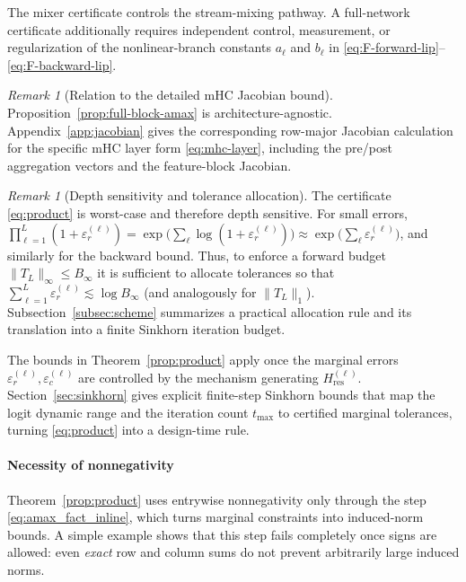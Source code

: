 \documentclass[11pt]{article}
\numberwithin{equation}{section}
\theoremstyle{plain}
\theoremstyle{definition}
\theoremstyle{remark}
\newtheorem{remark}[theorem]{Remark}
\newcommand{\Hres}{H_{\mathrm{res}}}
\begin{document}
The mixer certificate controls the stream-mixing pathway. A full-network certificate additionally requires independent control, measurement, or regularization of the nonlinear-branch constants $a_\ell$ and $b_\ell$ in \eqref{eq:F-forward-lip}--\eqref{eq:F-backward-lip}.

\begin{remark}[Relation to the detailed mHC Jacobian bound]
Proposition~\ref{prop:full-block-amax} is architecture-agnostic. Appendix~\ref{app:jacobian} gives the corresponding row-major Jacobian calculation for the specific mHC layer form \eqref{eq:mhc-layer}, including the pre/post aggregation vectors and the feature-block Jacobian.
\end{remark}

\begin{remark}[Depth sensitivity and tolerance allocation]\label{rem:depth_sensitivity}
The certificate \eqref{eq:product} is worst-case and therefore depth sensitive. For small errors,
$\prod_{\ell=1}^L(1+\varepsilon_r^{(\ell)})=\exp\!\big(\sum_\ell \log(1+\varepsilon_r^{(\ell)})\big)
\approx \exp\!\big(\sum_\ell \varepsilon_r^{(\ell)}\big)$, and similarly for the backward bound.
Thus, to enforce a forward budget $\|T_L\|_\infty\le B_\infty$ it is sufficient to allocate tolerances so that
$\sum_{\ell=1}^L \varepsilon_r^{(\ell)}\lesssim \log B_\infty$ (and analogously for $\|T_L\|_1$).
Subsection~\ref{subsec:scheme} summarizes a practical allocation rule and its translation into a finite Sinkhorn iteration budget.
\end{remark}

The bounds in Theorem~\ref{prop:product} apply once the marginal errors
$\varepsilon_r^{(\ell)},\varepsilon_c^{(\ell)}$ are controlled by the mechanism generating $\Hres^{(\ell)}$.
Section~\ref{sec:sinkhorn} gives explicit finite-step Sinkhorn bounds that map the logit dynamic range and the
iteration count $t_{\max}$ to certified marginal tolerances, turning \eqref{eq:product} into a design-time rule.

\paragraph{Necessity of nonnegativity} \label{par:necessity} Theorem~\ref{prop:product} uses entrywise nonnegativity only through the step \eqref{eq:amax_fact_inline}, which turns marginal constraints into induced-norm bounds. A simple example shows that this step fails completely once signs are allowed: even \emph{exact} row and column sums do not prevent arbitrarily large induced norms.
\end{document}
